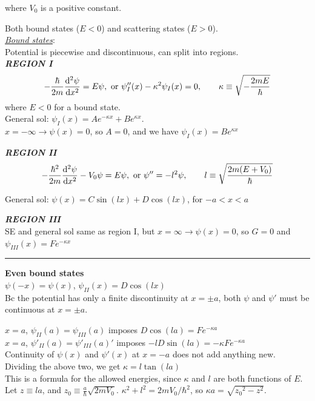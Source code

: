 where $V_0$ is a positive constant.

Both bound states ($E < 0$) and scattering states ($E > 0$). \\

\textit{\underline{Bound states}}: \\
Potential is piecewise and discontinuous, can split into regions. \\

\textbf{\textit{REGION I}}
$$-\frac{\hbar}{2m} \dv[2]{\psi}{x} = E \psi, \textrm{ or } \psi''_{I}(x) - \kappa^2 \psi_{I}(x) = 0, \qquad \kappa \equiv \sqrt{-\frac{2mE}{\hbar}}$$
where $E < 0$ for a bound state. \\
General sol: $\psi_{I}(x) = Ae^{-\kappa x} + B e^{\kappa x}$. \\
$x = -\infty \rightarrow \psi(x) = 0$, so $A = 0$, and we have $\psi_{I}(x) = Be^{\kappa x}$

\smallskip

\textbf{\textit{REGION II}} \\
$$-\frac{\hbar^2}{2m} \dv[2]{\psi}{x} - V_0 \psi = E \psi, \textrm{ or } \psi'' = -l^2 \psi, \qquad l \equiv \sqrt{\frac{2m (E + V_0)}{\hbar}}$$

General sol: $\psi(x) = C \sin(lx) + D \cos(lx)$, for $-a < x < a$

\smallskip

\textbf{\textit{REGION III}} \\
SE and general sol same as region I, but $x = \infty \rightarrow \psi(x) = 0$, so $G=0$ and $\psi_{III}(x) = Fe^{-\kappa x}$

\medskip
\hrule height 0.3pt \thinspace

\textbf{Even bound states} \\
$\psi(-x) = \psi(x)$, $\psi_{II}(x) = D \cos(lx)$ \\
Bc the potential has only a finite discontinuity at $x = \pm a$, both $\psi$ and $\psi'$ must be continuous at $x = \pm a$.

$x = a$, $\psi_{II}(a) = \psi_{III}(a)$ imposes $D \cos(la) = F e^{-\kappa a}$ \\

$x = a$, $\psi'_{II}(a) = \psi'_{III}(a)'$ imposes $-lD \sin(la) = -\kappa F e^{-\kappa a}$ \\

Continuity of $\psi(x)$ and $\psi'(x)$ at $x = -a$ does not add anything new. \\

Dividing the above two, we get $\kappa = l \tan(la)$ \\
This is a formula for the allowed energies, since $\kappa$ and $l$ are both functions of $E$. Let $z \equiv la$, and $z_0 \equiv \frac{a}{\hbar} \sqrt{2m V_0}$. $\kappa^2 + l^2 = 2m V_0 / \hbar^2$, so $\kappa a = \sqrt{{z_0}^2 - z^2}$. \\

